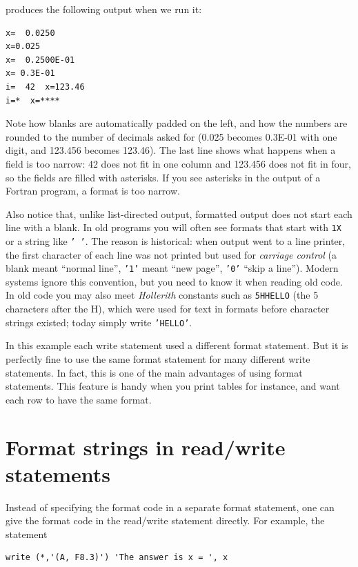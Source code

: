 produces the following output when we run it:

\begin{lstlisting}[style=output]
x=  0.0250
x=0.025
x=  0.2500E-01
x= 0.3E-01
i=  42  x=123.46
i=*  x=****
\end{lstlisting}

Note how blanks are automatically padded on the left, and how the numbers are rounded to the number of decimals asked for (0.025 becomes 0.3E-01 with one digit, and 123.456 becomes 123.46). The last line shows what happens when a field is too narrow: 42 does not fit in one column and 123.456 does not fit in four, so the fields are filled with asterisks. If you see asterisks in the output of a Fortran program, a format is too narrow.

Also notice that, unlike list-directed output, formatted output does not start each line with a blank. In old programs you will often see formats that start with \texttt{1X} or a string like \texttt{' '}. The reason is historical: when output went to a line printer, the first character of each line was not printed but used for \emph{carriage control} (a blank meant ``normal line'', \texttt{'1'} meant ``new page'', \texttt{'0'} ``skip a line''). Modern systems ignore this convention, but you need to know it when reading old code. In old code you may also meet \emph{Hollerith} constants such as \texttt{5HHELLO} (the 5 characters after the H), which were used for text in formats before character strings existed; today simply write \texttt{'HELLO'}.

In this example each write statement used a different format statement. But it is perfectly fine to use the same format statement for many different write statements. In fact, this is one of the main advantages of using format statements. This feature is handy when you print tables for instance, and want each row to have the same format.

\section{Format strings in read/write statements}

Instead of specifying the format code in a separate format statement, one can give the format code in the read/write statement directly. For example, the statement

\begin{lstlisting}[style=fortran77] 
      write (*,'(A, F8.3)') 'The answer is x = ', x
\end{lstlisting}

